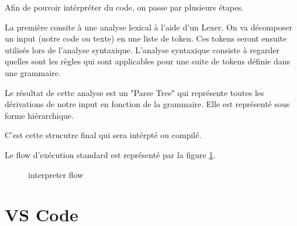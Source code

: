 \documentclass[
    iict, %
    il, %
]{heig-tb}
\begin{document}
Afin de pouvoir intérpréter du code, on passe par plusieurs étapes.

La première consite à une analyse lexical à l'aide d'un Lexer. On va décomposer un input (notre code ou texte) en une liste de token.
Ces tokens seront ensuite utilisés lors de l'analyse syntaxique. L'analyse syntaxique consiste à regarder quelles sont les règles qui sont applicables pour une suite de tokens définie dans une grammaire.

Le résultat de cette analyse est un "Parse Tree" qui représente toutes les dérivations de notre input en fonction de la grammaire.
Elle est représenté sous forme hiérarchique.

C'est cette strucutre final qui sera intérpté ou compilé.

Le flow d'exécution standard est représenté par la figure \ref{interpreter-flow}.

\begin{figure}[!h]
    \begin{center}
    \end{center}
    \caption[interpreter-flow Anatomy]{\label{interpreter-flow} interpreter flow}
\end{figure}



\section{VS Code}
\end{document}
